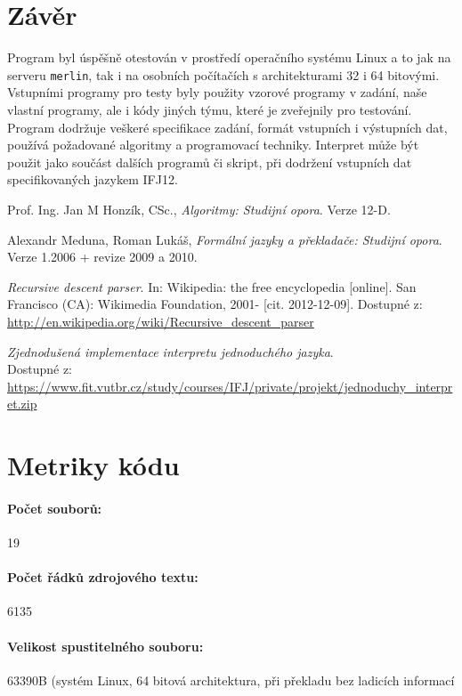 \documentclass[a4paper, 12pt]{article}[5.12.2012]
\begin{document}
\section{Závěr} \label{s:zaver}
Program byl úspěšně otestován v prostředí operačního systému Linux a to jak na serveru \texttt{merlin},
tak i na osobních počítačích s architekturami 32 i 64 bitovými. Vstupními programy pro testy byly použity
vzorové programy v zadání, naše vlastní programy, ale i kódy jiných týmu, které je zveřejnily pro testování.
Program dodržuje veškeré specifikace zadání, formát vstupních i výstupních dat, používá požadované algoritmy
a programovací techniky. Interpret může být použit jako součást dalších programů či skript, při dodržení vstupních
dat specifikovaných jazykem IFJ12.

\begin{thebibliography}{9}
  Prof. Ing. Jan M Honzík, CSc.,
  \emph{Algoritmy: Studijní opora}.
  Verze 12-D.

  Alexandr Meduna, Roman Lukáš,
  \emph{Formální jazyky a překladače: Studijní opora}.
  Verze 1.2006 + revize 2009 a 2010.

  \emph{Recursive descent parser}.
  In: Wikipedia: the free encyclopedia [online].
  San Francisco (CA): Wikimedia Foundation, 2001- [cit. 2012-12-09].
  Dostupné z: \url{http://en.wikipedia.org/wiki/Recursive_descent_parser}

  \emph{Zjednodušená implementace interpretu jednoduchého jazyka}.\\
  Dostupné z: \url{https://www.fit.vutbr.cz/study/courses/IFJ/private/projekt/jednoduchy_interpret.zip}
\end{thebibliography}

\appendix
\section{Metriky kódu} \label{a:metriky}
  \paragraph{Počet souborů:} 19
  \paragraph{Počet řádků zdrojového textu:} 6135
  \paragraph{Velikost spustitelného souboru:} 63390B (systém Linux, 64 bitová
  architektura, při překladu bez ladicích informací
\end{document}
